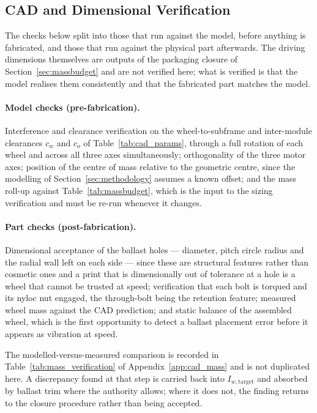 \subsection{CAD and Dimensional Verification}
\label{sec:cad_verification}

The checks below split into those that run against the model, before anything is
fabricated, and those that run against the physical part afterwards. The driving
dimensions themselves are outputs of the packaging closure of
Section~\ref{sec:massbudget} and are not verified here; what is verified is that
the model realises them consistently and that the fabricated part matches the
model.

\paragraph{Model checks (pre-fabrication).} Interference and clearance
verification on the wheel-to-subframe and inter-module clearances $c_w$ and $c_o$
of Table~\ref{tab:cad_params}, through a full rotation of each wheel and across
all three axes simultaneously; orthogonality of the three motor axes; position of
the centre of mass relative to the geometric centre, since the modelling of
Section~\ref{sec:methodology} assumes a known offset; and the mass roll-up against
Table~\ref{tab:massbudget}, which is the input to the sizing verification
and must be re-run whenever it changes.

\paragraph{Part checks (post-fabrication).} Dimensional acceptance of the ballast
holes --- diameter, pitch circle radius and the radial wall left on each side ---
since these are structural features rather than cosmetic ones and a print that is
dimensionally out of tolerance at a hole is a wheel that cannot be trusted at
speed; verification that each bolt is torqued and its nyloc nut engaged, the
through-bolt being the retention feature; measured wheel mass against the CAD
prediction; and static balance of the assembled wheel, which is the first
opportunity to detect a ballast placement error before it appears as vibration at
speed.

The modelled-versus-measured comparison is recorded in
Table~\ref{tab:mass_verification} of Appendix~\ref{app:cad_mass} and is not
duplicated here. A discrepancy found at that step is carried back into
$I_{w,\text{target}}$ and absorbed by ballast trim where the authority allows;
where it does not, the finding returns to
the closure procedure rather than being accepted.
